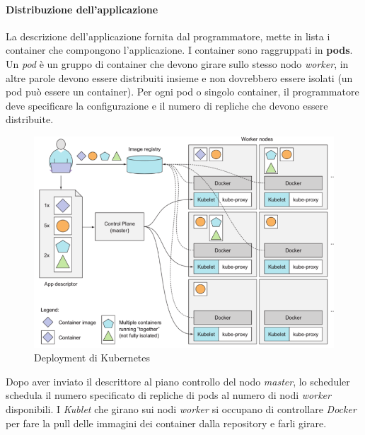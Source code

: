 \documentclass{article}
\begin{document}
\paragraph{Distribuzione dell'applicazione}
La descrizione dell'applicazione fornita dal programmatore, mette in lista i container che compongono l'applicazione. I container sono raggruppati in \textbf{pods}. \\
Un \textit{pod} è un gruppo di container che devono girare sullo stesso nodo \textit{worker}, in altre parole devono essere distribuiti insieme e non dovrebbero essere isolati (un pod può essere un container). Per ogni pod o singolo container, il programmatore deve specificare la configurazione e il numero di repliche che devono essere distribuite.
\begin{figure}[H]
    \centering
    \includegraphics[scale=0.3]{img/kubernetes deployment.png}
    \caption{Deployment di Kubernetes}
\end{figure}\noindent
Dopo aver inviato il descrittore al piano controllo del nodo \textit{master}, lo scheduler schedula il numero specificato di repliche di pods al numero di nodi \textit{worker} disponibili. I \textit{Kublet} che girano sui nodi \textit{worker} si occupano di controllare \textit{Docker} per fare la pull delle immagini dei container dalla repository e farli girare.
\end{document}
